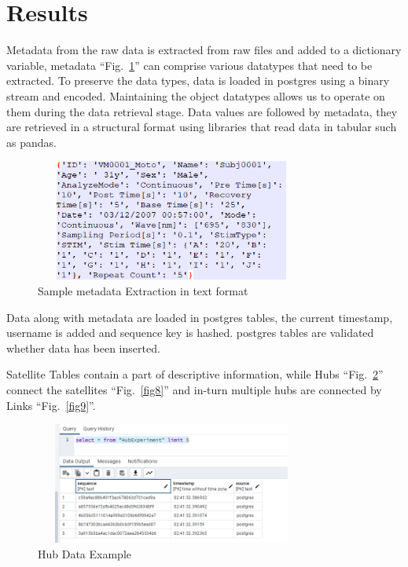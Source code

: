 \documentclass[conference]{IEEEtran}
\begin{document}
\section{Results}

Metadata from the raw data is extracted from raw files and added to a dictionary variable, metadata ``Fig.~\ref{fig6}'' can comprise various datatypes that need to be extracted. To preserve the data types, data is loaded in postgres using a binary stream and encoded. Maintaining the object datatypes allows us to operate on them during the data retrieval stage. Data values are followed by metadata, they are retrieved in a structural format using libraries that read data in tabular such as pandas.

\begin{figure}[htbp]
\centerline{\includegraphics[width=9cm, height=4cm]{Figure6.png}}
\caption{Sample metadata Extraction in text format}
\label{fig6}
\end{figure}

Data along with metadata are loaded in postgres tables, the current timestamp, username is added and sequence key is hashed. postgres tables are validated whether data has been inserted.


Satellite Tables contain a part of descriptive information, while Hubs ``Fig.~\ref{fig7}'' connect the satellites ``Fig.~\ref{fig8}'' and in-turn multiple hubs are connected by Links ``Fig.~\ref{fig9}''.

\begin{figure}[htbp]
\centerline{\includegraphics[width=9cm, height=4cm]{Figure7.png}}
\caption{Hub Data Example}
\label{fig7}
\end{figure}
\end{document}
